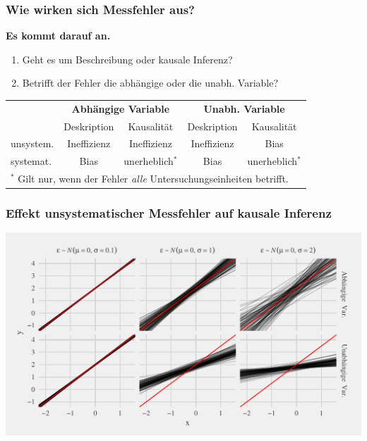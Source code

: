 \documentclass{beamer}\usepackage[]{graphicx}\usepackage[]{color}
\makeatletter
\def\maxwidth{ %
  \ifdim\Gin@nat@width>\linewidth
    \linewidth
  \else
    \Gin@nat@width
  \fi
}
\newenvironment{knitrout}{}{} %
\makeatother
\begin{document}
\begin{frame}
\frametitle{Wie wirken sich Messfehler aus?}
\textbf{Es kommt darauf an.}
\begin{enumerate}
  \item Geht es um Beschreibung oder kausale Inferenz?
  \item Betrifft der Fehler die abhängige oder die unabh. Variable?
\end{enumerate}
\vfill

\begin{tabular}{l*{4}{c}}
\toprule
~ & \multicolumn{2}{c}{\textbf{Abhängige Variable}} & \multicolumn{2}{c}{\textbf{Unabh. Variable}}\\
~ & Deskription & Kausalität & Deskription & Kausalität\\ \midrule
unsystem. & Ineffizienz & Ineffizienz & Ineffizienz & Bias \\
systemat. & Bias & unerheblich$^*$ & Bias & unerheblich$^*$\\
\bottomrule
\multicolumn{5}{l}{$^*$ Gilt nur, wenn der Fehler \textit{alle} Untersuchungseinheiten betrifft.}
\end{tabular}
\end{frame}

\begin{frame}
  \frametitle{Effekt unsystematischer Messfehler auf kausale Inferenz}
\begin{knitrout}
\color{fgcolor}
\includegraphics[width=\maxwidth]{figure/execute-error-simulation-1} 

\end{knitrout}
\end{frame}
\end{document}
